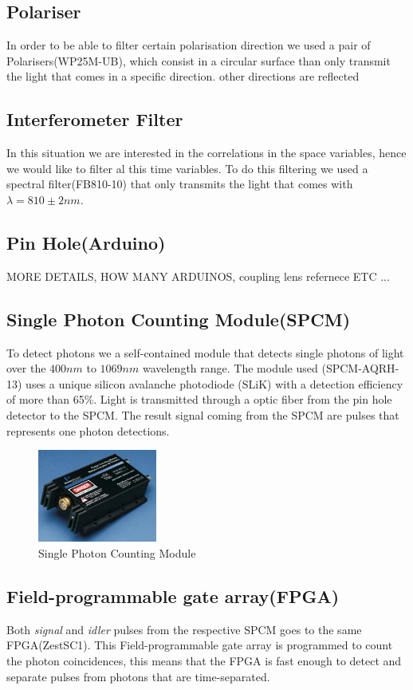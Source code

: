 \subsection{Polariser}
In order to be able to filter certain polarisation direction we used a pair of Polarisers(WP25M-UB), which consist 
in a circular surface than only transmit the light that comes in a specific direction. other directions are reflected

\subsection{Interferometer Filter}
In this situation we are interested in the correlations in the space variables, hence we would like to filter al this 
time variables. To do this filtering we used a spectral filter(FB810-10) that only transmits the light that comes
with $\lambda =810 \pm 2nm$.
\subsection{Pin Hole(Arduino)}
MORE DETAILS, HOW MANY ARDUINOS, coupling lens refernece ETC ...


\subsection{Single Photon Counting Module(SPCM)}
To detect photons we a self-contained module that detects single photons of light over the $400nm$ to $1069 nm$
wavelength range. The module used (SPCM-AQRH-13) uses a unique silicon avalanche photodiode (SLiK) with a detection efficiency of more than 65\%\cite{spcm}.
Light is transmitted through a optic fiber from the pin hole detector to the SPCM. The result signal coming
from the SPCM are pulses that represents one photon detections.
\begin{figure}[h]
\centering
\includegraphics[width=0.35\textwidth]{Figures/spcm.png}
\caption{Single Photon Counting Module} 
\label{fig:spcm}
\end{figure}
\subsection{Field-programmable gate array(FPGA)}
Both \textit{signal} and \textit{idler} pulses from the respective SPCM goes to the same FPGA(ZestSC1). This Field-programmable gate array is programmed
to count the photon coincidences, this means that the FPGA is fast enough to detect and separate pulses from photons 
that are time-separated. 




